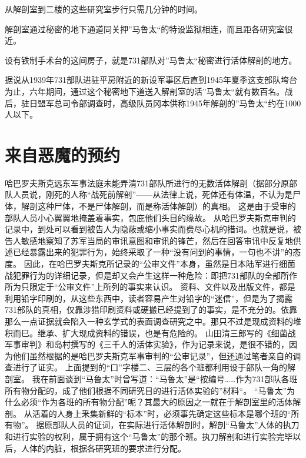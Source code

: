 \documentclass[a4paper,12pt,UTF8,twoside]{ctexbook}
\begin{document}
从解剖室到二楼的这些研究室步行只需几分钟的时间。

解剖室通过秘密的地下通道同关押”马鲁太“的特设监狱相连，而且距各研究室很近。

设有铁制手术台的这间房子，就是731部队对”马鲁太“秘密进行活体解剖的地方。

据说从1939年731部队进驻平房附近的新设军事区后直到1945年夏季这支部队垮台为止，六年期间，通过这个秘密地下道送入解剖室的活”马鲁太“就有数百名。战后，驻日盟军总司令部调查时，高级队员冈本供称1945年解剖的”马鲁太“约在1000人以下。

\section{来自恶魔的预约}

哈巴罗夫斯克远东军事法庭未能弄清731部队所进行的无数活体解剖（据部分原部队人员说，刚死的人称“战死前解剖”——从法律上说，死体还有体温，不认为是尸体，解剖这种尸体，不是尸体解剖，而是称活体解剖）的真相。
这是由于受审的部队人员小心翼翼地掩盖着事实，包庇他们头目的缘故。
从哈巴罗夫斯克审判的记录中，到处可以看到被告人为隐蔽或缩小事实而费尽心机的措词。也就是说，被告人敏感地察知了苏军当局的审讯意图和审讯的锋芒，然后在回答审讯中反复地供述已经暴露出来的犯罪行为，始终采取了一种“没有问到的事情，一句也不讲”的态度。
因此，在哈巴罗夫斯克所记录的“公审文件”本身，虽然是日本陆军进行细菌战犯罪行为的详细记录，但是却又会产生这样一种危险：即把731部队的全部所作所为只限定于“公审文件”上所列的事实来认识。
资料、文件以及出版文件，都是利用铅字印刷的，从这些东西中，读者容易产生对铅字的“迷信”，但是为了揭露731部队的真相，仅靠涉猎印刷资料或硬搬已经提到了的事实，是不充分的。依靠那么一点证据就会陷入一种玄学式的表面调查研究之中。那只不过是现成资料的堆积而巳。继承、扩大现成资料的错误，也是有危险的。
山田清三郎写的《细菌战军事审判》和岛村撰写的《三千人的活体实验》，作为记录来说，是很不错的，因为他们虽然根据的是哈巴罗夫斯克军事审判的“公审记录”，但还通过笔者亲自的调查进行了证实。
上面提到的“口”字楼二、三层的各个班都利用设于部队一角的解剖室。
我在前面谈到“马鲁太”时曾写道：“马鲁太”是“按编号……作为731部队各班所有物分配的，成了他们根据不同研究目的进行活体实验的”材料“。
“马鲁太”为什么必须“作为各班的所有物分配”呢？其最大的原因之一就在于解剖室里的活体解剖。
从活着的人身上釆集新鲜的“标本”时，必须事先确定这些标本是哪个班的“所有物”。
据原部队人员的证词，在实际进行活体解剖时，解剖“马鲁太”人体的执刀和进行实验的权利，属于拥有这个“马鲁太”的那个班。执刀解剖和进行实验完毕以后，人体的内脏，根据各研究班的要求进行分配。
\end{document}
